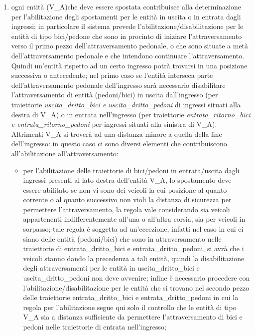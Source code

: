 \begin{enumerate}
\begin{enumerate}
\item ogni entità (V\_A)che deve essere spostata contribuisce alla determinazione per l'abilitazione degli spostamenti per le entità in uscita o in entrata dagli ingressi; in particolare il sistema prevede l'abilitazione/disabilitazione per le entità di tipo bici/pedone che sono in procinto di iniziare l'attraversamento verso il primo pezzo dell'attraversamento pedonale, o che sono situate a metà dell'attraversamento pedonale e che intendono continuare l'attraversamento. Quindi un'entità rispetto ad un certo ingresso potrà trovarsi in una posizione successiva o antecedente; nel primo caso se l'entità interseca parte dell'attraversamento pedonale dell'ingresso sarà necessario disabilitare l'attraversamento di entità (pedoni/bici) in uscita dall'ingresso (per traiettorie \textit{usci\-ta\_drit\-to\_bi\-ci e usci\-ta\_drit\-to\_pe\-do\-ni} di ingressi situati alla destra di V\_A) o in entrata nell'ingresso (per traiettorie \textit{en\-tra\-ta\_ri\-tor\-no\_bi\-ci e en\-tra\-ta\_ri\-tor\-no\_pe\-do\-ni} per ingressi situati alla sinistra di V\_A). Altrimenti V\_A si troverà ad una distanza minore a quella della fine dell'ingresso: in questo caso ci sono diversi elementi che contribuiscono all'abilitazione all'attraversamento:
\begin{itemize}
\item per l'abilitazione delle traiettorie di bici/pedoni in entrata/uscita dagli ingressi presenti al lato destra dell'entità V\_A, lo spostamento deve essere abilitato se non vi sono dei veicoli la cui posizione al quanto corrente o al quanto successivo non violi la distanza di sicurezza per permettere l'attraversamento, la regola vale considerando sia veicoli appartenenti indifferentemente all'una o all'altra corsia, sia per veicoli in sorpasso; tale regola è soggetta ad un'eccezione, infatti nel caso in cui ci siano delle entità (pedoni/bici) che sono in attraversamento nelle traiettorie di en\-tra\-ta\_drit\-to\_bi\-ci e en\-tra\-ta\_drit\-to\_pe\-do\-ni, si avrà che i veicoli stanno dando la precedenza a tali entità, quindi la disabilitazione degli attraversamenti per le entità in usci\-ta\_drit\-to\_bi\-ci e usci\-ta\_drit\-to\_pe\-do\-ni non deve avvenire; infine è necessario procedere con l'abilitazione/disabilitazione per le entità che si trovano nel secondo pezzo delle traiettorie en\-tra\-ta\_drit\-to\_bi\-ci e en\-tra\-ta\_drit\-to\_pe\-do\-ni in cui la regola per l'abilitazione segue qui solo il controllo che le entità di tipo V\_A sia a distanza sufficiente da permettere l'attraversamento di bici e pedoni nelle traiettorie di entrata nell'ingresso;

\end{itemize}
\end{enumerate}
\end{enumerate}
